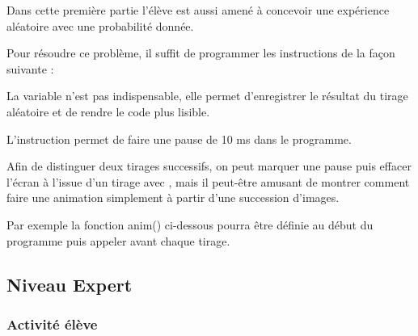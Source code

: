 Dans cette première partie l'élève est aussi amené à concevoir une expérience aléatoire avec une probabilité donnée.

\begin{methode}
Pour résoudre ce problème, il suffit de programmer les instructions de la façon suivante : 
\end{methode}

\begin{remarque}
La variable  n'est pas indispensable, elle permet d'enregistrer le résultat du tirage aléatoire et de rendre le code plus lisible.

L'instruction  permet de faire une pause de 10 ms dans le programme.

Afin de distinguer deux tirages successifs, on peut marquer une pause puis effacer l'écran à l'issue d'un tirage avec , mais il peut-être amusant de montrer comment faire une animation simplement à partir d'une succession d'images.

Par exemple la fonction anim() ci-dessous pourra être définie au début du programme puis appeler avant chaque tirage.

\end{remarque}



%
%
\newpage
\subsection{Niveau Expert}
\subsubsection{Activité élève}




